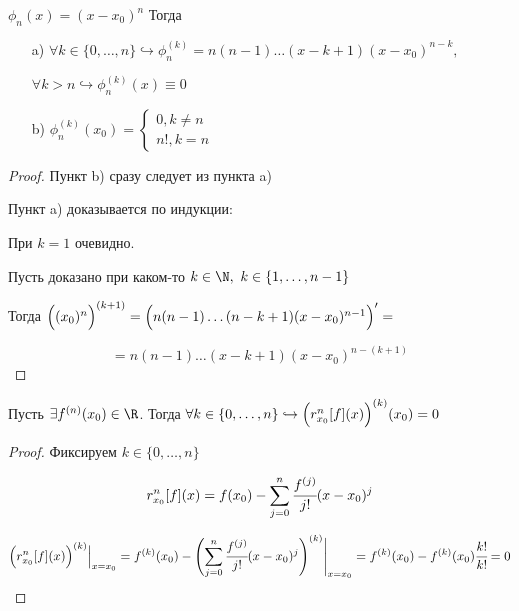\begin{lemma}
	$\phi_{n}(x) = (x-x_{0})^{n}$ Тогда 
	\begin{enumerate} 
	 	\item[a)] $\forall k \in \{0, \ldots, n\} \hookrightarrow \phi_{n}^{(k)} = n(n-1)\ldots (x-k+1)(x-x_{0})^{n-k}, $
	 	
	 	$ \forall k> n \hookrightarrow \phi_{n}^{(k)}(x) \equiv 0$
	 	\item[b)] $\phi_{n}^{(k)}(x_{0}) = \begin{cases}
	 		0, k \neq n\\
	 		n!, k =n
	 	\end{cases}$
	 \end{enumerate}
\end{lemma}
\begin{proof}
	Пункт b) сразу следует из пункта  a)
	
	Пункт a) доказывается по индукции:
	
	При $k = 1$ очевидно.
	
	Пусть доказано при каком-то $k \in \N, \ k \in \{1, \ldots, n-1\}$
	
	Тогда $\Bigl((x_{0})^{n}\Bigr)^{(k+1)} =\Bigl(n(n-1)\ldots(n-k+1)(x-x_{0})^{n-1}\Bigr)' =$
	
	$$= n(n-1)\ldots (x-k+1)(x-x_{0})^{n-(k+1)} $$
\end{proof}

\begin{lemma}
	Пусть $\exists f^{(n)}(x_{0}) \in \R$. Тогда $\forall k \in \{0, \ldots, n\} \hookrightarrow \Bigl(r_{x_{0}}^{n} [f](x) \Bigr)^{(k)}(x_{0}) = 0$
\end{lemma}
\begin{proof}
	Фиксируем $ k \in \{0, \ldots, n\}$
	
	$$r_{x_{0}}^{n} [f](x) = f(x_{0}) -  \sum\limits_{j = 0}^n \cfrac{f^{(j)}}{j!}(x-x_{0})^{j} $$
	
	$$\Bigl(r_{x_{0}}^{n} [f](x)\Bigr)^{(k)} \Big|_{x = x_{0}} = f^{(k)}(x_{0}) -  \Biggl(\sum\limits_{j = 0}^n \cfrac{f^{(j)}}{j!}(x-x_{0})^{j}\Biggr)^{(k)} \Bigg|_{x=x_{0}} = f^{(k)}(x_{0}) - f^{(k)}(x_{0}) \cfrac{k!}{k!} = 0
	$$
\end{proof}

